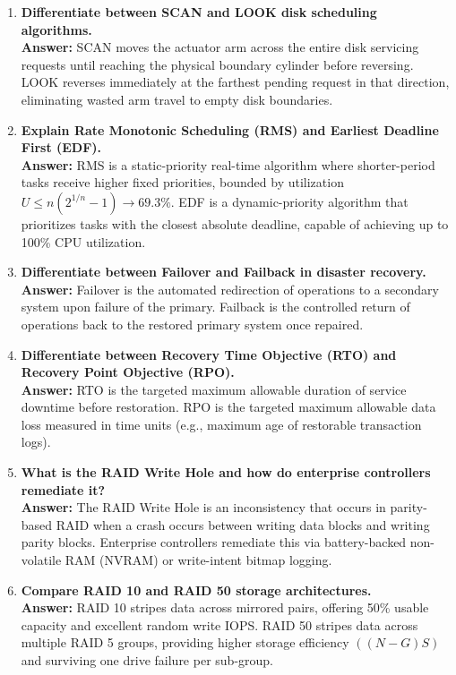 \begin{enumerate}[label=\textbf{Q\arabic*.},leftmargin=1.2cm]
\item \textbf{Differentiate between SCAN and LOOK disk scheduling algorithms.} \\
\textbf{Answer:} SCAN moves the actuator arm across the entire disk servicing requests until reaching the physical boundary cylinder before reversing. LOOK reverses immediately at the farthest pending request in that direction, eliminating wasted arm travel to empty disk boundaries.

\item \textbf{Explain Rate Monotonic Scheduling (RMS) and Earliest Deadline First (EDF).} \\
\textbf{Answer:} RMS is a static-priority real-time algorithm where shorter-period tasks receive higher fixed priorities, bounded by utilization $U \le n(2^{1/n}-1) \to 69.3\%$. EDF is a dynamic-priority algorithm that prioritizes tasks with the closest absolute deadline, capable of achieving up to 100\% CPU utilization.

\item \textbf{Differentiate between Failover and Failback in disaster recovery.} \\
\textbf{Answer:} Failover is the automated redirection of operations to a secondary system upon failure of the primary. Failback is the controlled return of operations back to the restored primary system once repaired.

\item \textbf{Differentiate between Recovery Time Objective (RTO) and Recovery Point Objective (RPO).} \\
\textbf{Answer:} RTO is the targeted maximum allowable duration of service downtime before restoration. RPO is the targeted maximum allowable data loss measured in time units (e.g., maximum age of restorable transaction logs).

\item \textbf{What is the RAID Write Hole and how do enterprise controllers remediate it?} \\
\textbf{Answer:} The RAID Write Hole is an inconsistency that occurs in parity-based RAID when a crash occurs between writing data blocks and writing parity blocks. Enterprise controllers remediate this via battery-backed non-volatile RAM (NVRAM) or write-intent bitmap logging.

\item \textbf{Compare RAID 10 and RAID 50 storage architectures.} \\
\textbf{Answer:} RAID 10 stripes data across mirrored pairs, offering 50\% usable capacity and excellent random write IOPS. RAID 50 stripes data across multiple RAID 5 groups, providing higher storage efficiency $((N-G)S)$ and surviving one drive failure per sub-group.


\end{enumerate}
